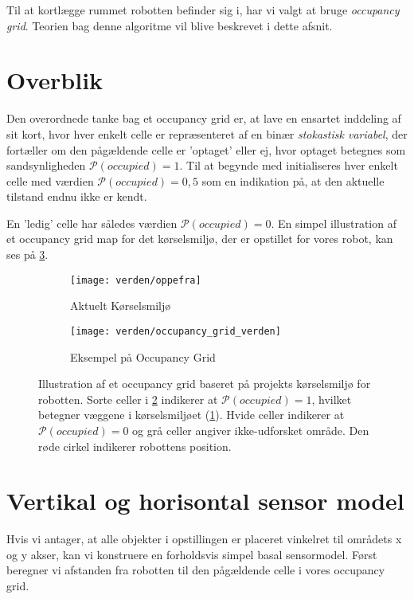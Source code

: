 Til at kortlægge rummet robotten befinder sig i, har vi valgt at bruge \textit{occupancy grid}.
Teorien bag denne algoritme vil blive beskrevet i dette afsnit.

\section{Overblik}
Den overordnede tanke bag et occupancy grid er, at lave en ensartet inddeling af sit kort, hvor hver enkelt celle er repræsenteret af en binær \textit{stokastisk variabel}, der fortæller om den pågældende celle er 'optaget' eller ej, hvor optaget betegnes som sandsynligheden $\mathcal{P}(occupied) = 1$.
Til at begynde med initialiseres hver enkelt celle med værdien $\mathcal{P}(occupied) = 0,5$ som en indikation på, at den aktuelle tilstand endnu ikke er kendt.

En 'ledig' celle har således værdien $\mathcal{P}(occupied) = 0$.
En simpel illustration af et occupancy grid map for det kørselsmiljø, der er opstillet for vores robot, kan ses på \cref{map:approx_occupancy_grid}.

\begin{figure}[h] %
\centering
	\begin{subfigure}[b]{.45\textwidth}
	\centering
	\texttt{[image: verden/oppefra]}
	\caption{Aktuelt Kørselsmiljø}
	\label{map:world}
	\end{subfigure}
	\begin{subfigure}[b]{.45\textwidth}
	\centering
	\texttt{[image: verden/occupancy\_grid\_verden]}
	\caption{Eksempel på Occupancy Grid}
	\label{map:occupancy_grid}
	\end{subfigure}
\caption{Illustration af et occupancy grid baseret på projekts kørselsmiljø for robotten. Sorte celler i \cref{map:occupancy_grid} indikerer at $\mathcal{P}(occupied) = 1$, hvilket betegner væggene i kørselsmiljøet (\cref{map:world}). Hvide celler indikerer at $\mathcal{P}(occupied) = 0$ og grå celler angiver ikke-udforsket område. Den røde cirkel indikerer robottens position.}
\label{map:approx_occupancy_grid}
\end{figure}

\section{Vertikal og horisontal sensor model}\label{mapping:sensormodel}
Hvis vi antager, at alle objekter i opstillingen er placeret vinkelret til områdets x og y akser,
kan vi konstruere en forholdsvis simpel basal sensormodel.
Først beregner vi afstanden fra robotten til den pågældende celle i vores occupancy grid.

